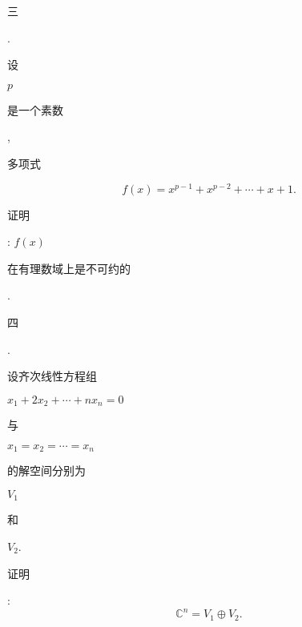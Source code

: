 \documentclass[10pt]{article}
\begin{document}
\begin{CJK}{UTF8}{mj}三\end{CJK}. \begin{CJK}{UTF8}{mj}设\end{CJK} $p$ \begin{CJK}{UTF8}{mj}是一个素数\end{CJK}, \begin{CJK}{UTF8}{mj}多项式\end{CJK}
$$
f(x)=x^{p-1}+x^{p-2}+\cdots+x+1 .
$$
\begin{CJK}{UTF8}{mj}证明\end{CJK}: $f(x)$ \begin{CJK}{UTF8}{mj}在有理数域上是不可约的\end{CJK}.

\begin{CJK}{UTF8}{mj}四\end{CJK}. \begin{CJK}{UTF8}{mj}设齐次线性方程组\end{CJK} $x_{1}+2 x_{2}+\cdots+n x_{n}=0$ \begin{CJK}{UTF8}{mj}与\end{CJK} $x_{1}=x_{2}=\cdots=x_{n}$ \begin{CJK}{UTF8}{mj}的解空间分别为\end{CJK} $V_{1}$ \begin{CJK}{UTF8}{mj}和\end{CJK} $V_{2}$. \begin{CJK}{UTF8}{mj}证明\end{CJK}:
$$
\mathbb{C}^{n}=V_{1} \oplus V_{2} .
$$
\end{document}
